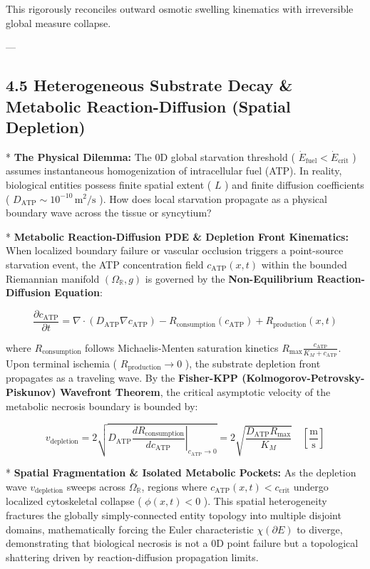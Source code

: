 \documentclass[11pt,a4paper]{article}
\theoremstyle{definition}
\theoremstyle{remark}
\begin{document}
This rigorously reconciles outward osmotic swelling kinematics with irreversible global measure collapse.

---

\subsection{4.5 Heterogeneous Substrate Decay \& Metabolic Reaction-Diffusion (Spatial Depletion)}
* \textbf{The Physical Dilemma:} The 0D global starvation threshold ( $\dot{E}_{\text{fuel}} < \dot{E}_{\text{crit}}$ ) assumes instantaneous homogenization of intracellular fuel (ATP). In reality, biological entities possess finite spatial extent ( $L$ ) and finite diffusion coefficients ( $D_{\text{ATP}} \sim 10^{-10} \, \mathrm{m^2/s}$ ). How does local starvation propagate as a physical boundary wave across the tissue or syncytium?

* \textbf{Metabolic Reaction-Diffusion PDE \& Depletion Front Kinematics:}
When localized boundary failure or vascular occlusion triggers a point-source starvation event, the ATP concentration field $c_{\text{ATP}}(x, t)$ within the bounded Riemannian manifold $(\Omega_{\mathbb{R}}, g)$ is governed by the \textbf{Non-Equilibrium Reaction-Diffusion Equation}:


\begin{equation}
\boxed{\frac{\partial c_{\text{ATP}}}{\partial t} = \nabla \cdot (D_{\text{ATP}} \nabla c_{\text{ATP}}) - R_{\text{consumption}}(c_{\text{ATP}}) + R_{\text{production}}(x, t)}
\end{equation}


where $R_{\text{consumption}}$ follows Michaelis-Menten saturation kinetics $R_{\max} \frac{c_{\text{ATP}}}{K_M + c_{\text{ATP}}}$. Upon terminal ischemia ( $R_{\text{production}} \to 0$ ), the substrate depletion front propagates as a traveling wave. By the \textbf{Fisher-KPP (Kolmogorov-Petrovsky-Piskunov) Wavefront Theorem}, the critical asymptotic velocity of the metabolic necrosis boundary is bounded by:


\begin{equation}
\boxed{v_{\text{depletion}} = 2 \sqrt{D_{\text{ATP}} \left. \frac{d R_{\text{consumption}}}{d c_{\text{ATP}}} \right|_{c_{\text{ATP}} \to 0}} = 2 \sqrt{\frac{D_{\text{ATP}} R_{\max}}{K_M}} \quad [\frac{\mathrm{m}}{\mathrm{s}}]}
\end{equation}


* \textbf{Spatial Fragmentation \& Isolated Metabolic Pockets:}
As the depletion wave $v_{\text{depletion}}$ sweeps across $\Omega_{\mathbb{R}}$, regions where $c_{\text{ATP}}(x, t) < c_{\text{crit}}$ undergo localized cytoskeletal collapse ( $\phi(x,t) < 0$ ). This spatial heterogeneity fractures the globally simply-connected entity topology into multiple disjoint domains, mathematically forcing the Euler characteristic $\chi(\partial E)$ to diverge, demonstrating that biological necrosis is not a 0D point failure but a topological shattering driven by reaction-diffusion propagation limits.
\end{document}
